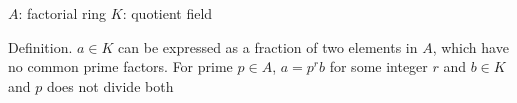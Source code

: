 $A$: factorial ring
$K$: quotient field

Definition.
$a \in K$ can be expressed as a fraction of two elements in $A$, which have no common prime factors.
For prime $p \in A$, $a = p^r b$ for some integer $r$ and $b \in K$ and $p$ does not divide both 
